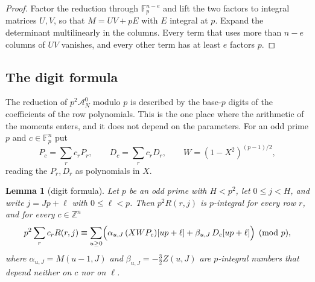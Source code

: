 \documentclass[11pt]{amsart}
\newtheorem{lemma}[theorem]{Lemma}
\theoremstyle{definition}
\theoremstyle{remark}
\numberwithin{equation}{section}
\newcommand{\Z}{\mathbb Z}
\newcommand{\F}{\mathbb F}
\newcommand{\cA}{\mathcal A}
\begin{document}
\begin{proof}
Factor the reduction through $\F_p^{n-e}$ and lift the two factors to integral matrices $U,V$, so that
$M=UV+pE$ with $E$ integral at $p$. Expand the determinant multilinearly in the columns. Every term that
uses more than $n-e$ columns of $UV$ vanishes, and every other term has at least $e$ factors $p$.
\end{proof}

\subsection{The digit formula}
The reduction of $p^2\cA^0_N$ modulo $p$ is described by the base-$p$ digits of the coefficients of the
row polynomials. This is the one place where the arithmetic of the moments enters, and it does not depend
on the parameters. For an odd prime $p$ and $c\in\F_p^n$ put
\[
 P_c=\sum_rc_rP_r,\qquad D_c=\sum_rc_rD_r,\qquad W=(1-X^2)^{(p-1)/2},
\]
reading the $P_r,D_r$ as polynomials in $X$.

\begin{lemma}[digit formula]\label{lem:digits}
Let $p$ be an odd prime with $H<p^2$, let $0\le j<H$, and write $j=Jp+\ell$ with $0\le\ell<p$. Then
$p^2R(r,j)$ is $p$-integral for every row $r$, and for every $c\in\Z^n$
\[
 p^2\sum_rc_rR(r,j)\equiv\sum_{u\ge0}\Bigl(\alpha_{u,J}\,(XWP_c)[up+\ell]+\beta_{u,J}\,D_c[up+\ell]\Bigr)
 \pmod p ,
\]
where $\alpha_{u,J}=M(u-1,J)$ and $\beta_{u,J}=-\tfrac32Z(u,J)$ are $p$-integral numbers that depend neither
on $c$ nor on $\ell$.
\end{lemma}
\end{document}
